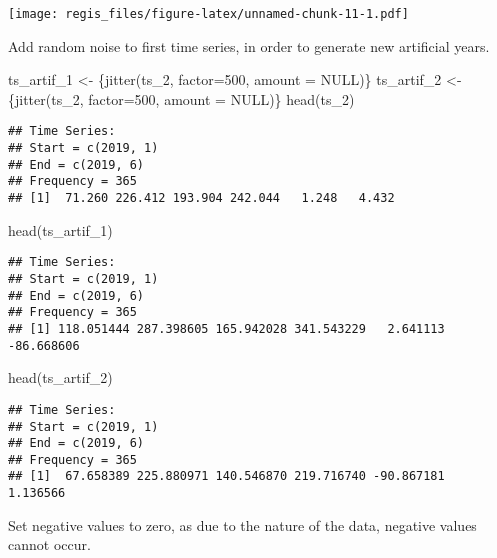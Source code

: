 \documentclass[
]{article}
\newenvironment{Shaded}{\begin{snugshade}}{\end{snugshade}}
\newcommand{\AttributeTok}[1]{\textcolor[rgb]{0.77,0.63,0.00}{#1}}
\newcommand{\ConstantTok}[1]{\textcolor[rgb]{0.00,0.00,0.00}{#1}}
\newcommand{\DecValTok}[1]{\textcolor[rgb]{0.00,0.00,0.81}{#1}}
\newcommand{\FunctionTok}[1]{\textcolor[rgb]{0.00,0.00,0.00}{#1}}
\newcommand{\NormalTok}[1]{#1}
\newcommand{\OtherTok}[1]{\textcolor[rgb]{0.56,0.35,0.01}{#1}}
\begin{document}
\texttt{[image: regis\_files/figure-latex/unnamed-chunk-11-1.pdf]}

Add random noise to first time series, in order to generate new
artificial years.

\begin{Shaded}
\begin{Highlighting}[]
\NormalTok{ts\_artif\_1 }\OtherTok{\textless{}{-}}\NormalTok{ \{}\FunctionTok{jitter}\NormalTok{(ts\_2, }\AttributeTok{factor=}\DecValTok{500}\NormalTok{, }\AttributeTok{amount =} \ConstantTok{NULL}\NormalTok{)\}}
\NormalTok{ts\_artif\_2 }\OtherTok{\textless{}{-}}\NormalTok{ \{}\FunctionTok{jitter}\NormalTok{(ts\_2, }\AttributeTok{factor=}\DecValTok{500}\NormalTok{, }\AttributeTok{amount =} \ConstantTok{NULL}\NormalTok{)\}}
\FunctionTok{head}\NormalTok{(ts\_2)}
\end{Highlighting}
\end{Shaded}

\begin{verbatim}
## Time Series:
## Start = c(2019, 1) 
## End = c(2019, 6) 
## Frequency = 365 
## [1]  71.260 226.412 193.904 242.044   1.248   4.432
\end{verbatim}

\begin{Shaded}
\begin{Highlighting}[]
\FunctionTok{head}\NormalTok{(ts\_artif\_1)}
\end{Highlighting}
\end{Shaded}

\begin{verbatim}
## Time Series:
## Start = c(2019, 1) 
## End = c(2019, 6) 
## Frequency = 365 
## [1] 118.051444 287.398605 165.942028 341.543229   2.641113 -86.668606
\end{verbatim}

\begin{Shaded}
\begin{Highlighting}[]
\FunctionTok{head}\NormalTok{(ts\_artif\_2)}
\end{Highlighting}
\end{Shaded}

\begin{verbatim}
## Time Series:
## Start = c(2019, 1) 
## End = c(2019, 6) 
## Frequency = 365 
## [1]  67.658389 225.880971 140.546870 219.716740 -90.867181   1.136566
\end{verbatim}

Set negative values to zero, as due to the nature of the data, negative
values cannot occur.
\end{document}
